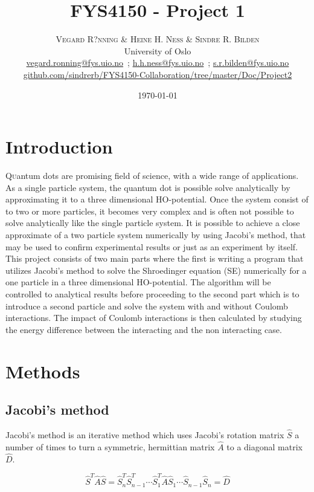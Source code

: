 \documentclass[twoside,twocolumn]{article}
\title{FYS4150 - Project 1} %
\author{%
	\textsc{Vegard R?nning \& Heine H. Ness \& Sindre R. Bilden} \\[1ex] %
	\normalsize University of Oslo \\ %
	\normalsize \href{mailto:vegard.ronning@fys.uio.no}{vegard.ronning@fys.uio.no}\ ; \href{mailto:h.h.ness@fys.uio.no}{h.h.ness@fys.uio.no}\ ; \href{mailto:s.r.bilden@fys.uio.no}{s.r.bilden@fys.uio.no}\\%
	\footnotesize \href{https://github.com/sindrerb/FYS4150-Collaboration/tree/master/Doc/Project2}{github.com/sindrerb/FYS4150-Collaboration/tree/master/Doc/Project2}
}
\date{\today} %
\begin{document}
	
	\maketitle
	
	
	\section{Introduction}
	\lettrine[nindent=0em,lines=2]{Q}uantum dots are promising field of science, with a wide range of applications. As a single particle system, the quantum dot is possible solve analytically by approximating it to a three dimensional HO-potential. Once the system consist of to two or more particles, it becomes very complex and is often not possible to solve analytically like the single particle system. It is possible to achieve a close approximate of a two particle system numerically by using Jacobi's method, that may be used to confirm experimental results or just as an experiment by itself. This project consists of two main parts where the first is writing a program that utilizes Jacobi's method to solve the Shroedinger equation (SE) numerically for a one particle in a three dimensional HO-potential. The algorithm will be controlled to analytical results before proceeding to the second part which is to introduce a second particle and solve the system with and without Coulomb interactions. The impact of Coulomb interactions is then calculated by studying the energy difference between the interacting and the non interacting case. 
	\section{Methods}
	\subsection{Jacobi's method}
	Jacobi's method is an iterative method which uses Jacobi's rotation matrix $\hat{S}$ a number of times to turn a symmetric, hermittian matrix $\hat{A}$ to a diagonal matrix $\hat{D}$.
	
	\begin{equation*}
	\hat{S}^T\hat{A}\hat{S} = \hat{S}^T_n\hat{S}^T_{n-1}\cdots\hat{S}^T_1\hat{A}\hat{S}_1\cdots\hat{S}_{n-1}\hat{S}_n = \hat{D}
	\end{equation*}
	
\end{document}
